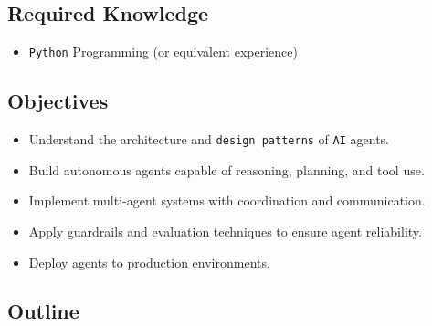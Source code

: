 \documentclass[
]{article}
\providecommand{\tightlist}{%
  \setlength{\itemsep}{0pt}\setlength{\parskip}{0pt}}
\begin{document}
\subsection{Required Knowledge}\label{required-knowledge}

\begin{itemize}
\tightlist
\item
  \texttt{Python} Programming (or equivalent experience)
\end{itemize}

\subsection{Objectives}\label{objectives}

\begin{itemize}
\tightlist
\item
  Understand the architecture and \texttt{design\ patterns} of
  \texttt{AI} agents.
\item
  Build autonomous agents capable of reasoning, planning, and tool use.
\item
  Implement multi-agent systems with coordination and communication.
\item
  Apply guardrails and evaluation techniques to ensure agent
  reliability.
\item
  Deploy agents to production environments.
\end{itemize}

\subsection{Outline}\label{outline}
\end{document}
